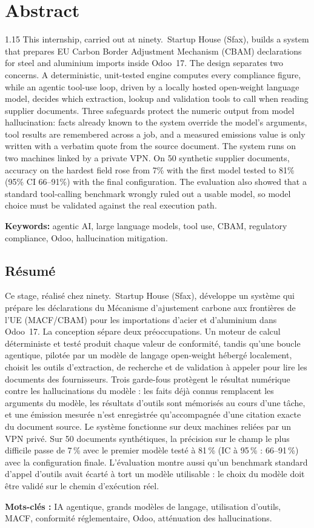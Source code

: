 \chapter*{Abstract}
\thispagestyle{MyStyle}

\begin{spacing}{1.15}
This internship, carried out at ninety.\ Startup House (Sfax), builds a
system that prepares EU Carbon Border Adjustment Mechanism (CBAM)
declarations for steel and aluminium imports inside Odoo~17. The design
separates two concerns. A deterministic, unit-tested engine computes every
compliance figure, while an agentic tool-use loop, driven by a locally
hosted open-weight language model, decides which extraction, lookup and
validation tools to call when reading supplier documents. Three safeguards
protect the numeric output from model hallucination: facts already known
to the system override the model's arguments, tool results are remembered
across a job, and a measured emissions value is only written with a
verbatim quote from the source document. The system runs on two machines
linked by a private VPN. On 50 synthetic supplier documents, accuracy on
the hardest field rose from 7\% with the first model tested to 81\% (95\%
CI 66--91\%) with the final configuration. The evaluation also showed that
a standard tool-calling benchmark wrongly ruled out a usable model, so
model choice must be validated against the real execution path.

\smallskip
\noindent\textbf{Keywords:} agentic AI, large language models, tool use,
CBAM, regulatory compliance, Odoo, hallucination mitigation.

\section*{Résumé}

Ce stage, réalisé chez ninety.\ Startup House (Sfax), développe un système
qui prépare les déclarations du Mécanisme d'ajustement carbone aux
frontières de l'UE (MACF/CBAM) pour les importations d'acier et
d'aluminium dans Odoo~17. La conception sépare deux préoccupations. Un
moteur de calcul déterministe et testé produit chaque valeur de
conformité, tandis qu'une boucle agentique, pilotée par un modèle de
langage open-weight hébergé localement, choisit les outils d'extraction,
de recherche et de validation à appeler pour lire les documents des
fournisseurs. Trois garde-fous protègent le résultat numérique contre les
hallucinations du modèle : les faits déjà connus remplacent les arguments
du modèle, les résultats d'outils sont mémorisés au cours d'une tâche, et
une émission mesurée n'est enregistrée qu'accompagnée d'une citation
exacte du document source. Le système fonctionne sur deux machines
reliées par un VPN privé. Sur 50 documents synthétiques, la précision sur
le champ le plus difficile passe de 7\,\% avec le premier modèle testé à
81\,\% (IC à 95\,\% : 66--91\,\%) avec la configuration finale.
L'évaluation montre aussi qu'un benchmark standard d'appel d'outils avait
écarté à tort un modèle utilisable : le choix du modèle doit être validé
sur le chemin d'exécution réel.

\smallskip
\noindent\textbf{Mots-clés :} IA agentique, grands modèles de langage,
utilisation d'outils, MACF, conformité réglementaire, Odoo, atténuation
des hallucinations.
\end{spacing}
